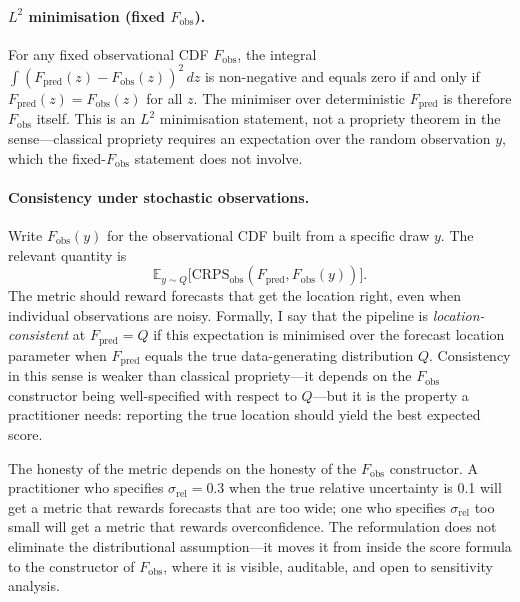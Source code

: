 \paragraph{$L^2$ minimisation (fixed $F_\text{obs}$).}
For any fixed observational CDF $F_\text{obs}$, the integral
$\int (F_\text{pred}(z) - F_\text{obs}(z))^2\,dz$
is non-negative and equals zero if and only if $F_\text{pred}(z) = F_\text{obs}(z)$ for all $z$. The minimiser over deterministic $F_\text{pred}$ is therefore $F_\text{obs}$ itself. This is an $L^2$ minimisation statement, not a propriety theorem in the \citet{gneiting2007strictly} sense---classical propriety requires an expectation over the random observation $y$, which the fixed-$F_\text{obs}$ statement does not involve.

\paragraph{Consistency under stochastic observations.}
Write $F_\text{obs}(y)$ for the observational CDF built from a specific draw $y$. The relevant quantity is
%
\begin{equation}
    \mathbb{E}_{y \sim Q} \bigl[ \text{CRPS}_\text{obs}(F_\text{pred}, F_\text{obs}(y)) \bigr].
\end{equation}
%
The metric should reward forecasts that get the location right, even when individual observations are noisy. Formally, I say that the pipeline is \emph{location-consistent} at $F_\text{pred} = Q$ if this expectation is minimised over the forecast location parameter when $F_\text{pred}$ equals the true data-generating distribution $Q$. Consistency in this sense is weaker than classical propriety---it depends on the $F_\text{obs}$ constructor being well-specified with respect to $Q$---but it is the property a practitioner needs: reporting the true location should yield the best expected score.

The honesty of the metric depends on the honesty of the $F_\text{obs}$ constructor. A practitioner who specifies $\sigma_\text{rel} = 0.3$ when the true relative uncertainty is 0.1 will get a metric that rewards forecasts that are too wide; one who specifies $\sigma_\text{rel}$ too small will get a metric that rewards overconfidence. The reformulation does not eliminate the distributional assumption---it moves it from inside the score formula to the constructor of $F_\text{obs}$, where it is visible, auditable, and open to sensitivity analysis.

